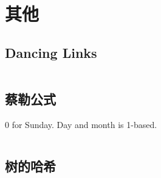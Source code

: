 \chapter{其他}
\section{Dancing Links}
\inputminted{cpp}{\source/others/dancing-links.cpp}
\section{蔡勒公式}
0 for Sunday. Day and month is 1-based.
\inputminted{cpp}{\source/others/zeller.cpp}
\section{树的哈希}
\inputminted{cpp}{\source/others/tree-hash.cpp}
